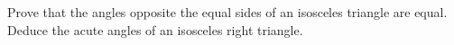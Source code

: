 Prove that the angles opposite the equal sides of an isosceles triangle are equal. Deduce the acute angles of an isosceles right triangle.
